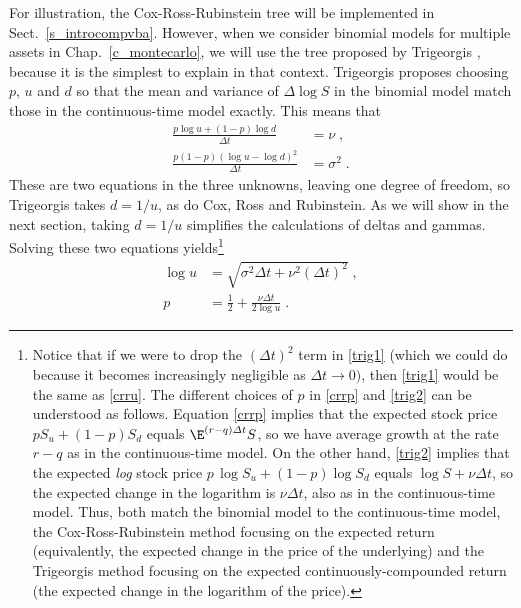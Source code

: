 For illustration,  the Cox-Ross-Rubinstein tree will be implemented in Sect.~\ref{s_introcompvba}.  However, when we consider binomial models for multiple assets in Chap.~\ref{c_montecarlo}, we will use the tree proposed by Trigeorgis \cite{Trigeorgis},  because it is the simplest to explain in that context.
Trigeorgis proposes choosing $p$, $u$ and $d$ so that the mean and variance of $\varDelta \log S$ in the binomial model match those in the continuous-time model exactly.  This means that
\begin{subequations}
\begin{align*}
\frac{p\log u+(1-p)\log d}{\varDelta t} &= \nu\; ,\\
\frac{p(1-p)(\log u-\log d)^2}{\varDelta t} &= \sigma^2\;.
\end{align*}
\end{subequations}
These are two equations in the three unknowns, leaving one degree of freedom, so Trigeorgis takes $d=1/u$, as do Cox, Ross and Rubinstein.  As we will show in the next section, taking $d=1/u$ simplifies the calculations of deltas and gammas.
Solving these two equations yields\footnote{Notice that if we were to drop the $(\varDelta t)^2$ term in \eqref{trig1} (which we could do because it becomes increasingly negligible as $\varDelta t \rightarrow 0)$, then  \eqref{trig1} would be the same as \eqref{crru}.  The different choices of $p$ in \eqref{crrp} and \eqref{trig2} can be understood as follows.  Equation \eqref{crrp} implies that the expected stock price
$pS_u + (1-p)S_d$ equals $\E^{(r-q)\varDelta t}S$, so we have average growth at the rate $r-q$ as in the continuous-time model.  On the other hand,  \eqref{trig2} implies that the expected \emph{log} stock price $p \,\log S_u + (1-p) \log S_d$ equals $\log S + \nu \varDelta t$, so the expected change in the logarithm is $\nu\varDelta t$, also as in the continuous-time model.  Thus, both match the binomial model to the continuous-time model, the Cox-Ross-Rubinstein method focusing on the expected return (equivalently, the expected change in the price of the underlying) and the Trigeorgis method focusing on the expected continuously-compounded return (the expected change in the logarithm of the price).}
\begin{subequations}
\begin{align}
\log u&=\sqrt{\sigma^2\varDelta t + \nu^2(\varDelta t)^2}\;,\label{trig1}\\
p &= \frac{1}{2}+\frac{\nu\varDelta t}{2\log u}\;.\label{trig2}
\end{align}
\end{subequations}






